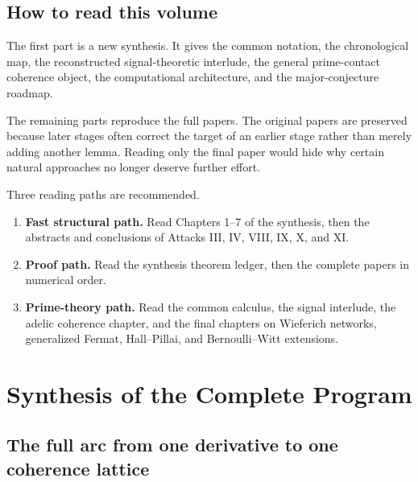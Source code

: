 
\chapter*{How to read this volume}
The first part is a new synthesis. It gives the common notation, the chronological map, the reconstructed signal-theoretic interlude, the general prime-contact coherence object, the computational architecture, and the major-conjecture roadmap.

The remaining parts reproduce the full papers. The original papers are preserved because later stages often correct the target of an earlier stage rather than merely adding another lemma. Reading only the final paper would hide why certain natural approaches no longer deserve further effort.

Three reading paths are recommended.

\begin{enumerate}[leftmargin=1.5em]
\item \textbf{Fast structural path.} Read Chapters 1--7 of the synthesis, then the abstracts and conclusions of Attacks III, IV, VIII, IX, X, and XI.
\item \textbf{Proof path.} Read the synthesis theorem ledger, then the complete papers in numerical order.
\item \textbf{Prime-theory path.} Read the common calculus, the signal interlude, the adelic coherence chapter, and the final chapters on Wieferich networks, generalized Fermat, Hall--Pillai, and Bernoulli--Witt extensions.
\end{enumerate}

\tableofcontents
\mainmatter

\part{Synthesis of the Complete Program}

\chapter{The full arc from one derivative to one coherence lattice}

